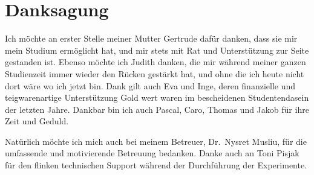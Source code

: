 \documentclass[thesis.tex]{subfiles}
\begin{document}
\chapter*{Danksagung}

Ich möchte an erster Stelle meiner Mutter Gertrude dafür danken, dass sie mir mein Studium ermöglicht hat, und mir stets mit Rat und Unterstützung zur Seite gestanden ist. Ebenso möchte ich Judith danken, die mir während meiner ganzen Studienzeit immer wieder den Rücken gestärkt hat, und ohne die ich heute nicht dort wäre wo ich jetzt bin. Dank gilt auch Eva und Inge, deren finanzielle und teigwarenartige Unterstützung Gold wert waren im bescheidenen Studentendasein der letzten Jahre. Dankbar bin ich auch Pascal, Caro, Thomas und Jakob für ihre Zeit und Geduld.

Natürlich möchte ich mich auch bei meinem Betreuer, Dr.\ Nysret Musliu, für die umfassende und motivierende Betreuung bedanken. Danke auch an Toni Pisjak für den flinken technischen Support während der Durchführung der Experimente.
\end{document}
